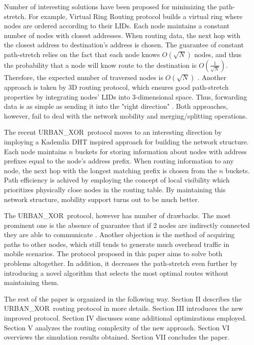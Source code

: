 \documentclass[14pt]{extarticle}
\theoremstyle{definition}
\newcommand{\urbanxor}{URBAN\_XOR}
\begin{document}
Number of interesting solutions have been proposed for minimizing the path-stretch. For example, Virtual Ring Routing protocol builds a virtual ring where nodes are ordered according to their LIDs. Each node maintains a constant number of nodes with closest addresses. When routing data, the next hop with the closest address to destination's address is chosen. The guarantee of constant path-stretch relies on the fact that each node knows $O(\sqrt{N})$ nodes, and thus the probability that a node will know route to the destination is $O(\frac{1}{\sqrt{N}})$. Therefore, the expected number of traversed nodes is $O(\sqrt{N})$ \cite{VRR}. Another approach is taken by 3D routing protocol, which ensures good path-stretch properties by integrating nodes' LIDs into 3-dimensional space. Thus, forwarding data is as simple as sending it into the "right direction" \cite{3drp}. Both approaches, however, fail to deal with the network mobility and merging/splitting operations. 

The recent \urbanxor\ protocol moves to an interesting direction by imploying a Kademlia DHT inspired approach for building the network structure. Each node maintains $n$ buckets for storing information about nodes with address prefixes equal to the node's address prefix. When routing information to any node, the next hop with the longest matching prefix is chosen from the $n$ buckets. Path efficiency is achived by employing the concept of local visibility which prioritizes physically close nodes in the routing table. By maintaining this network structure, mobility support turns out to be much better.

The \urbanxor\ protocol, however has number of drawbacks. The most prominent one is the absence of guarantee that if 2 nodes are indirectly connected they are able to communicate \cite{Pasquini}. Another objection is the method of acquiring paths to other nodes, which still tends to generate much overhead traffic in mobile scenarios. The protocol proposed in this paper aims to solve both problems altogether. In addition, it decreases the path-stretch even further by introducing a novel algorithm that selects the most optimal routes without maintaining them.

The rest of the paper is organized in the following way. Section II describes the \urbanxor\ routing protocol in more details. Section III introduces the new improved protocol. Section IV discusses some additional optimizations employed. Section V analyzes the routing complexity of the new approach. Section VI overviews the simulation results obtained. Section VII concludes the paper.
\end{document}

